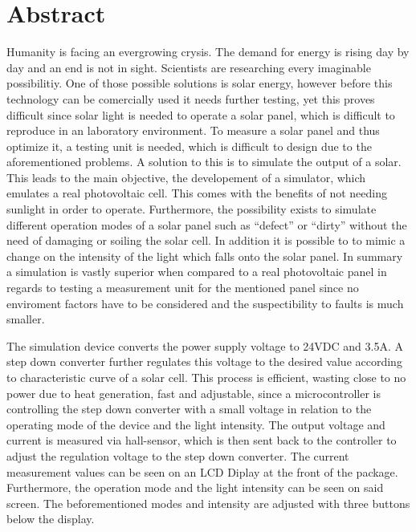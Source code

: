 \documentclass[a4paper]{fhnwreport}
\begin{document}
\section{Abstract}

Humanity is facing an evergrowing crysis. The demand for energy is rising day by day and an end is not in sight. Scientists are researching every  imaginable possibilitiy. One of those possible solutions is solar energy, however before this technology can be comercially used it needs further testing, yet this proves difficult since solar light is needed to operate a solar panel, which is difficult to reproduce in an laboratory environment. To measure a solar panel and thus optimize it, a testing unit is needed, which is difficult to design due to the aforementioned problems. A solution to this is to simulate the output of a solar. This leads to the main objective, the developement of a simulator, which emulates a real photovoltaic cell. This comes with the benefits of not needing sunlight in order to operate. Furthermore, the possibility exists to simulate different operation modes of a solar panel such as ``defect'' or ``dirty'' without the need of damaging or soiling the solar cell. In addition it is possible to to mimic a change on the intensity of the light which falls onto the solar panel. In summary a simulation is vastly superior when compared to a real photovoltaic panel in regards to testing a measurement unit for the mentioned panel
since no enviroment factors have to be considered and the suspectibility to faults is much smaller. 

The simulation device converts the power supply voltage to 24VDC and 3.5A. A step down converter further regulates this voltage to the desired value according to characteristic curve of a solar cell. This process is efficient, wasting close to no power due to heat generation, fast and adjustable, since a microcontroller is controlling the step down converter with a small voltage in relation to the operating mode of the device and the light intensity. The output voltage and current is measured via hall-sensor, which is then sent back to the controller to adjust the regulation voltage to the step down converter. The current measurement values can be seen on an LCD Diplay at the front of the package. Furthermore, the operation mode and the light intensity can be seen on said screen. The beforementioned modes and intensity are adjusted with three buttons below the display. 
\end{document}
